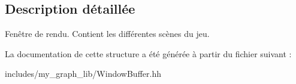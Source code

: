\subsection{Description détaillée}
Fenêtre de rendu. Contient les différentes scènes du jeu. 

La documentation de cette structure a été générée à partir du fichier suivant \+:\begin{DoxyCompactItemize}
\item 
includes/my\+\_\+graph\+\_\+lib/Window\+Buffer.\+hh\end{DoxyCompactItemize}
